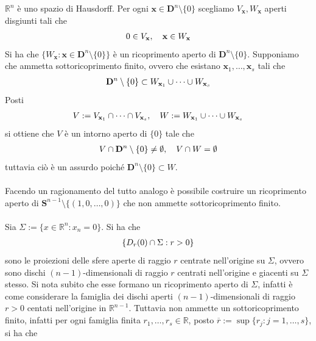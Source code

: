 \documentclass[oneside, 11pt]{amsbook}
\makeatletter
\newcommand{\0}{{(0)}}
\newcommand{\3}{{(3)}}
\theoremstyle{colonplain}
\theoremstyle{colondefinition}
\theoremstyle{colonremark}
\numberwithin{equation}{chapter}
\renewcommand{\proofname}{Dimostrazione}
\renewenvironment{proof}[1][\proofname]{\par
  \pushQED{\qed}%
  \normalfont \topsep6\p@\@plus6\p@\relax
  \trivlist
  \item[\hskip\labelsep\bfseries #1:]\ignorespaces
}{%
  \popQED\endtrivlist\@endpefalse
}
\makeatother
\begin{document}
\begin{proof}
$\mathbb{R}^n$ è uno spazio di Hausdorff. Per ogni $\mathbf{x} \in \mathbf{D}^n \setminus \{ 0 \}$ scegliamo $V_\mathbf{x}, W_\mathbf{x}$ aperti disgiunti tali che
\begin{align}
    0 \in V_\mathbf{x}, \quad \mathbf{x} \in W_\mathbf{x} \notag
\end{align}
Si ha che $\{ W_\mathbf{x} : \mathbf{x} \in \mathbf{D}^n \setminus \{ 0 \} \}$ è un ricoprimento aperto di $\mathbf{D}^n \setminus \{ 0 \}$. Supponiamo che ammetta sottoricoprimento finito, ovvero che esistano $\mathbf{x}_1, \dots, \mathbf{x}_s$ tali che
\begin{align}
    \mathbf{D}^n \setminus \{ 0 \} \subset W_{\mathbf{x}_1} \cup \dots \cup W_{\mathbf{x}_s} \notag
\end{align}
Posti
\begin{align}
    V := V_{\mathbf{x}_1} \cap \dots \cap V_{\mathbf{x}_s}, \quad W := W_{\mathbf{x}_1} \cup \dots \cup W_{\mathbf{x}_s} \notag
\end{align}
si ottiene che $V$ è un intorno aperto di $\{ 0 \}$ tale che
\begin{align}
    V \cap \mathbf{D}^n \setminus \{ 0 \} \neq \emptyset, \quad V \cap W = \emptyset \notag
\end{align}
tuttavia ciò è un assurdo poiché $\mathbf{D}^n \setminus \{ 0 \} \subset W$. \\ \\
Facendo un ragionamento del tutto analogo è possibile costruire un ricoprimento aperto di $\mathbf{S}^{n - 1} \setminus \{ (1, 0, \dots, 0) \}$ che non ammette sottoricoprimento finito. \\ \\
Sia $\Sigma := \{ x \in \mathbb{R}^n : x_n = 0 \}$. Si ha che
\begin{align}
    \{ D_r(0) \cap \Sigma : r > 0 \} \notag
\end{align}
sono le proiezioni delle sfere aperte di raggio $r$ centrate nell'origine su $\Sigma$, ovvero sono dischi $(n - 1)$-dimensionali di raggio $r$ centrati nell'origine e giacenti su $\Sigma$ stesso. Si nota subito che esse formano un ricoprimento aperto di $\Sigma$, infatti è come considerare la famiglia dei dischi aperti $(n - 1)$-dimensionali di raggio $r > 0$ centati nell'origine in $\mathbb{R}^{n - 1}$. Tuttavia non ammette un sottoricoprimento finito, infatti per ogni famiglia finita $r_1, \dots, r_s \in \mathbb{R}$, posto $\overline{r} := \sup \{ r_j : j = 1, \dots, s \}$, si ha che
\begin{align}

\end{align}
\end{proof}
\end{document}
